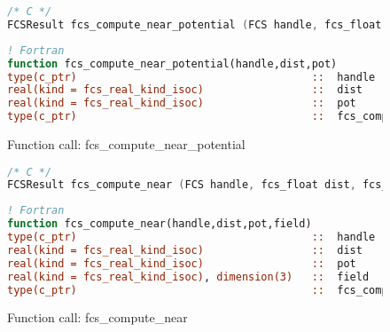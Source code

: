 \begin{figure}[htb]
\begin{lstlisting}[language=C,frame=trBL,breaklines,basicstyle=\ttfamily,prebreak={\raisebox{0ex}[0ex][0ex]{\ensuremath{\hookleftarrow}}}]
/* C */
FCSResult fcs_compute_near_potential (FCS handle, fcs_float dist, fcs_float *pot);
\end{lstlisting}
\begin{lstlisting}[language=Fortran,frame=trBL,breaklines,basicstyle=\ttfamily,prebreak={\raisebox{0ex}[0ex][0ex]{\ensuremath{\hookleftarrow}}}]
! Fortran
function fcs_compute_near_potential(handle,dist,pot)
type(c_ptr)                                     ::  handle
real(kind = fcs_real_kind_isoc)                 ::  dist
real(kind = fcs_real_kind_isoc)                 ::  pot
type(c_ptr)                                     ::  fcs_compute_near_potential
\end{lstlisting}
\caption{Function call: fcs\_compute\_near\_potential}
\label{fig:fcs_compute_near_potential}
\end{figure}

\begin{figure}[htb]
\begin{lstlisting}[language=C,frame=trBL,breaklines,basicstyle=\ttfamily,prebreak={\raisebox{0ex}[0ex][0ex]{\ensuremath{\hookleftarrow}}}]
/* C */
FCSResult fcs_compute_near (FCS handle, fcs_float dist, fcs_float *pot, fcs_float *field);
\end{lstlisting}
\begin{lstlisting}[language=Fortran,frame=trBL,breaklines,basicstyle=\ttfamily,prebreak={\raisebox{0ex}[0ex][0ex]{\ensuremath{\hookleftarrow}}}]
! Fortran
function fcs_compute_near(handle,dist,pot,field)
type(c_ptr)                                     ::  handle
real(kind = fcs_real_kind_isoc)                 ::  dist
real(kind = fcs_real_kind_isoc)                 ::  pot
real(kind = fcs_real_kind_isoc), dimension(3)   ::  field
type(c_ptr)                                     ::  fcs_compute_near
\end{lstlisting}
\caption{Function call: fcs\_compute\_near}
\label{fig:fcs_compute_near}
\end{figure}

